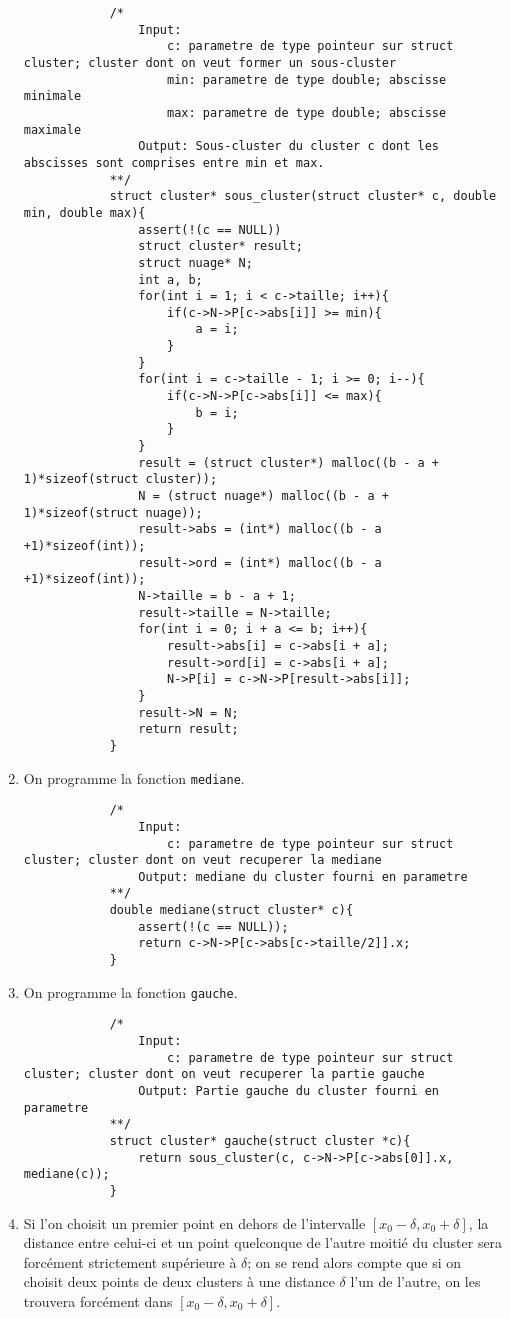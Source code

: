 \documentclass[10pt]{article}
\newcommand{\f}[1]{\texttt{#1}}
\begin{document}
\begin{enumerate}[start=4,label={\bfseries Question \arabic*}]
		\begin{lstlisting}
			/*
				Input:	
					c: parametre de type pointeur sur struct cluster; cluster dont on veut former un sous-cluster
					min: parametre de type double; abscisse minimale
					max: parametre de type double; abscisse maximale
				Output: Sous-cluster du cluster c dont les abscisses sont comprises entre min et max.
			**/
			struct cluster* sous_cluster(struct cluster* c, double min, double max){
				assert(!(c == NULL))
				struct cluster* result;
				struct nuage* N;
				int a, b;
				for(int i = 1; i < c->taille; i++){
					if(c->N->P[c->abs[i]] >= min){
						a = i;
					}
				}
				for(int i = c->taille - 1; i >= 0; i--){
					if(c->N->P[c->abs[i]] <= max){
						b = i;
					}
				}
				result = (struct cluster*) malloc((b - a + 1)*sizeof(struct cluster));
				N = (struct nuage*) malloc((b - a + 1)*sizeof(struct nuage));
				result->abs = (int*) malloc((b - a +1)*sizeof(int));
				result->ord = (int*) malloc((b - a +1)*sizeof(int));
				N->taille = b - a + 1;
				result->taille = N->taille;
				for(int i = 0; i + a <= b; i++){
					result->abs[i] = c->abs[i + a];
					result->ord[i] = c->abs[i + a];
					N->P[i] = c->N->P[result->abs[i]];
				}
				result->N = N;
				return result;
			}
		\end{lstlisting}
		\item On programme la fonction \f{mediane}.
		\begin{lstlisting}
			/*
				Input:	
					c: parametre de type pointeur sur struct cluster; cluster dont on veut recuperer la mediane
				Output: mediane du cluster fourni en parametre
			**/
			double mediane(struct cluster* c){
				assert(!(c == NULL));
				return c->N->P[c->abs[c->taille/2]].x;
			}
		\end{lstlisting}
		\item On programme la fonction \f{gauche}.
		\begin{lstlisting}
			/*
				Input:	
					c: parametre de type pointeur sur struct cluster; cluster dont on veut recuperer la partie gauche
				Output: Partie gauche du cluster fourni en parametre
			**/
			struct cluster* gauche(struct cluster *c){
				return sous_cluster(c, c->N->P[c->abs[0]].x, mediane(c));
			}
		\end{lstlisting}
		\item Si l'on choisit un premier point en dehors de l'intervalle $[x_0-\delta,x_0+\delta]$, la distance entre celui-ci et un point quelconque de l'autre moitié du cluster sera forcément strictement supérieure à $\delta$; on se rend alors compte que si on choisit deux points de deux clusters à une distance $\delta$ l'un de l'autre, on les trouvera forcément dans $[x_0-\delta,x_0+\delta]$.

\end{enumerate}
\end{document}
